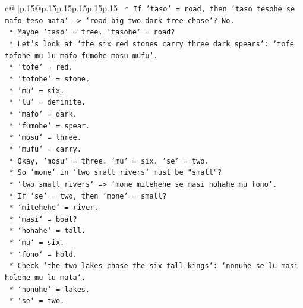 \documentclass{article}
\begin{document}
{\begin{supertabular}{c@{$\;$}|p{.15\linewidth}@{}p{.15\linewidth}p{.15\linewidth}p{.15\linewidth}p{.15\linewidth}p{.15\linewidth}}
{{{\texttt{                        *   If `taso` = road, then `taso tesohe se mafo teso mata` {-}> `road big two dark tree chase`? No.} \\
\texttt{                        *   Maybe `taso` = tree. `tasohe` = road?} \\
\texttt{                        *   Let's look at `the six red stones carry three dark spears`: `tofe tofohe mu lu mafo fumohe mosu mufu`.} \\
\texttt{                            *   `tofe` = red.} \\
\texttt{                            *   `tofohe` = stone.} \\
\texttt{                            *   `mu` = six.} \\
\texttt{                            *   `lu` = definite.} \\
\texttt{                            *   `mafo` = dark.} \\
\texttt{                            *   `fumohe` = spear.} \\
\texttt{                            *   `mosu` = three.} \\
\texttt{                            *   `mufu` = carry.} \\
\texttt{                        *   Okay, `mosu` = three. `mu` = six. `se` = two.} \\
\texttt{                        *   So `mone` in `two small rivers` must be "small"?} \\
\texttt{                        *   `two small rivers` => `mone mitehehe se masi hohahe mu fono`.} \\
\texttt{                            *   If `se` = two, then `mone` = small?} \\
\texttt{                            *   `mitehehe` = river.} \\
\texttt{                            *   `masi` = boat?} \\
\texttt{                            *   `hohahe` = tall.} \\
\texttt{                            *   `mu` = six.} \\
\texttt{                            *   `fono` = hold.} \\
\texttt{                        *   Check `the two lakes chase the six tall kings`: `nonuhe se lu masi holehe mu lu mata`.} \\
\texttt{                            *   `nonuhe` = lakes.} \\
\texttt{                            *   `se` = two.} \\
}}}
\end{supertabular}}
\end{document}
